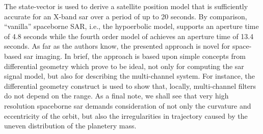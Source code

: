 \par
The state-vector is used to derive a satellite position model that is sufficiently accurate for an X-band \gls{sar} over a period of up to 20 seconds. By comparison, ``vanilla'' spaceborne SAR, i.e., the hypoerbolic model, supports an aperture time of 4.8 seconds while the fourth order model of \cite{Luo2014} achieves an aperture time of 13.4 seconds. As far as the authors know, the presented approach is novel for space-based \gls{sar} imaging. In brief, the approach is based upon simple concepts from differential geometry which prove to be ideal, not only for computing the \gls{sar} signal model, but also for describing the multi-channel system. For instance, the differential geometry construct is used to show that, locally, multi-channel filters do not depend on the range. As a final note, we shall see that very high resolution spaceborne \gls{sar} demands consideration of not only the curvature and eccentricity of the orbit, but also the irregularities in trajectory caused by the uneven distribution of the planetery mass.
